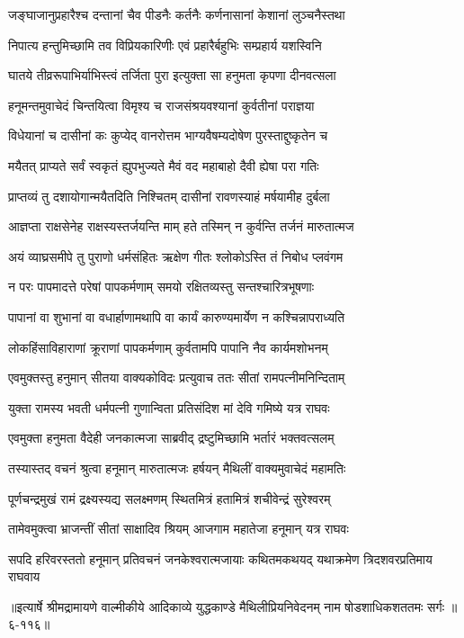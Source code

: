 \twolineshloka
{जङ्घाजानुप्रहारैश्च दन्तानां चैव पीडनैः}
{कर्तनैः कर्णनासानां केशानां लुञ्चनैस्तथा} %

\twolineshloka
{निपात्य हन्तुमिच्छामि तव विप्रियकारिणीः}
{एवं प्रहारैर्बहुभिः सम्प्रहार्य यशस्विनि} %

\twolineshloka
{घातये तीव्ररूपाभिर्याभिस्त्वं तर्जिता पुरा}
{इत्युक्ता सा हनुमता कृपणा दीनवत्सला} %

\twolineshloka
{हनूमन्तमुवाचेदं चिन्तयित्वा विमृश्य च}
{राजसंश्रयवश्यानां कुर्वतीनां पराज्ञया} %

\twolineshloka
{विधेयानां च दासीनां कः कुप्येद् वानरोत्तम}
{भाग्यवैषम्यदोषेण पुरस्ताद्दुष्कृतेन च} %

\twolineshloka
{मयैतत् प्राप्यते सर्वं स्वकृतं ह्युपभुज्यते}
{मैवं वद महाबाहो दैवी ह्येषा परा गतिः} %

\twolineshloka
{प्राप्तव्यं तु दशायोगान्मयैतदिति निश्चितम्}
{दासीनां रावणस्याहं मर्षयामीह दुर्बला} %

\twolineshloka
{आज्ञप्ता राक्षसेनेह राक्षस्यस्तर्जयन्ति माम्}
{हते तस्मिन् न कुर्वन्ति तर्जनं मारुतात्मज} %

\twolineshloka
{अयं व्याघ्रसमीपे तु पुराणो धर्मसंहितः}
{ऋक्षेण गीतः श्लोकोऽस्ति तं निबोध प्लवंगम} %

\twolineshloka
{न परः पापमादत्ते परेषां पापकर्मणाम्}
{समयो रक्षितव्यस्तु सन्तश्चारित्रभूषणाः} %

\twolineshloka
{पापानां वा शुभानां वा वधार्हाणामथापि वा}
{कार्यं कारुण्यमार्येण न कश्चिन्नापराध्यति} %

\twolineshloka
{लोकहिंसाविहाराणां क्रूराणां पापकर्मणाम्}
{कुर्वतामपि पापानि नैव कार्यमशोभनम्} %

\twolineshloka
{एवमुक्तस्तु हनुमान् सीतया वाक्यकोविदः}
{प्रत्युवाच ततः सीतां रामपत्नीमनिन्दिताम्} %

\twolineshloka
{युक्ता रामस्य भवती धर्मपत्नी गुणान्विता}
{प्रतिसंदिश मां देवि गमिष्ये यत्र राघवः} %

\twolineshloka
{एवमुक्ता हनुमता वैदेही जनकात्मजा}
{साब्रवीद् द्रष्टुमिच्छामि भर्तारं भक्तवत्सलम्} %

\twolineshloka
{तस्यास्तद् वचनं श्रुत्वा हनूमान् मारुतात्मजः}
{हर्षयन् मैथिलीं वाक्यमुवाचेदं महामतिः} %

\twolineshloka
{पूर्णचन्द्रमुखं रामं द्रक्ष्यस्यद्य सलक्ष्मणम्}
{स्थितमित्रं हतामित्रं शचीवेन्द्रं सुरेश्वरम्} %

\twolineshloka
{तामेवमुक्त्वा भ्राजन्तीं सीतां साक्षादिव श्रियम्}
{आजगाम महातेजा हनूमान् यत्र राघवः} %

\twolineshloka
{सपदि हरिवरस्ततो हनूमान् प्रतिवचनं जनकेश्वरात्मजायाः}
{कथितमकथयद् यथाक्रमेण त्रिदशवरप्रतिमाय राघवाय} %


॥इत्यार्षे श्रीमद्रामायणे वाल्मीकीये आदिकाव्ये युद्धकाण्डे मैथिलीप्रियनिवेदनम् नाम षोडशाधिकशततमः सर्गः ॥६-११६॥
